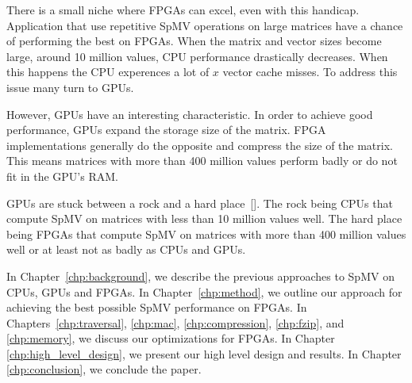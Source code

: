 \par There is a small niche where FPGAs can excel, even with this handicap. Application that use repetitive SpMV operations on large matrices have a chance of performing the best on FPGAs. When the matrix and vector sizes  become large, around 10 million values, CPU performance drastically decreases. When this happens the CPU experences a lot of $x$ vector cache misses. To address this issue many turn to GPUs.
\par However, GPUs have an interesting characteristic. In order to achieve good performance, GPUs expand the storage size of the matrix. FPGA implementations generally do the opposite and compress the size of the matrix. This means matrices with more than 400 million values perform badly or do not fit in the GPU's RAM.
\par GPUs are stuck between a rock and a hard place~[\cite{prelim:davis0}]. The rock being CPUs that compute SpMV on matrices with less than 10 million values well. The hard place being FPGAs that compute SpMV on matrices with more than 400 million values well or at least not as badly as CPUs and GPUs.
\par In Chapter~\ref{chp:background}, we describe the previous approaches to SpMV on CPUs, GPUs and FPGAs. In Chapter~\ref{chp:method}, we outline our approach for achieving the best possible SpMV performance on FPGAs. In Chapters~\ref{chp:traversal}, \ref{chp:mac}, \ref{chp:compression}, \ref{chp:fzip}, and \ref{chp:memory}, we discuss our optimizations for FPGAs. In Chapter \ref{chp:high_level_design}, we present our high level design and results. In Chapter \ref{chp:conclusion}, we conclude the paper.
